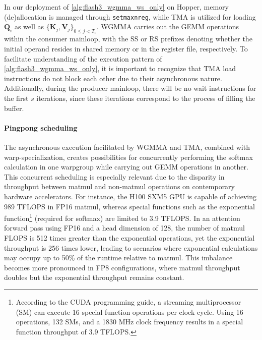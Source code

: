 In our deployment of \cref{alg:flash3_wgmma_ws_only} on Hopper, memory (de)allocation is managed through \verb|setmaxnreg|, while TMA is utilized for loading $\mathbf{Q}_i$ as well as $\{ \mathbf{K}_j, \mathbf{V}_j \}_{0 \leq j < T_c}$. WGMMA carries out the GEMM operations within the consumer mainloop, with the SS or RS prefixes denoting whether the initial operand resides in shared memory or in the register file, respectively. To facilitate understanding of the execution pattern of \cref{alg:flash3_wgmma_ws_only}, it is important to recognize that TMA load instructions do not block each other due to their asynchronous nature. Additionally, during the producer mainloop, there will be no wait instructions for the first $s$ iterations, since these iterations correspond to the process of filling the buffer.

\paragraph{Pingpong scheduling} The asynchronous execution facilitated by WGMMA and TMA, combined with warp-specialization, creates possibilities for concurrently performing the softmax calculation in one warpgroup while carrying out GEMM operations in another. This concurrent scheduling is especially relevant due to the disparity in throughput between matmul and non-matmul operations on contemporary hardware accelerators. For instance, the H100 SXM5 GPU is capable of achieving 989 TFLOPS in FP16 matmul, whereas special functions such as the exponential function\footnote{According to the CUDA programming guide, a streaming multiprocessor (SM) can execute 16 special function operations per clock cycle. Using 16 operations, 132 SMs, and a 1830 MHz clock frequency results in a special function throughput of 3.9 TFLOPS.} (required for softmax) are limited to 3.9 TFLOPS. In an attention forward pass using FP16 and a head dimension of 128, the number of matmul FLOPS is 512 times greater than the exponential operations, yet the exponential throughput is 256 times lower, leading to scenarios where exponential calculations may occupy up to 50\% of the runtime relative to matmul. This imbalance becomes more pronounced in FP8 configurations, where matmul throughput doubles but the exponential throughput remains constant.

